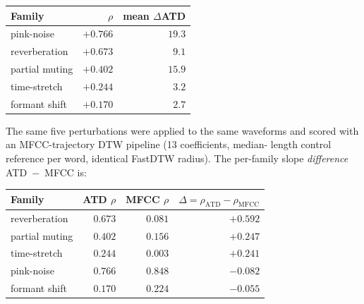 \begin{tabular}{lrr}
\toprule
Family & $\rho$ & mean $\Delta$ATD \\
\midrule
pink-noise       & $+0.766$ & $19.3$ \\
reverberation    & $+0.673$ & $9.1$  \\
partial muting   & $+0.402$ & $15.9$ \\
time-stretch     & $+0.244$ & $3.2$  \\
formant shift    & $+0.170$ & $2.7$  \\
\bottomrule
\end{tabular}

The same five perturbations were applied to the same waveforms and
scored with an MFCC-trajectory DTW pipeline (13 coefficients, median-
length control reference per word, identical FastDTW radius). The
per-family slope \emph{difference} ATD~$-$~MFCC is:

\begin{tabular}{lrrr}
\toprule
Family & ATD $\rho$ & MFCC $\rho$ & $\Delta = \rho_\text{ATD} - \rho_\text{MFCC}$ \\
\midrule
reverberation    & $0.673$ & $0.081$ & $\mathbf{+0.592}$ \\
partial muting   & $0.402$ & $0.156$ & $\mathbf{+0.247}$ \\
time-stretch     & $0.244$ & $0.003$ & $\mathbf{+0.241}$ \\
pink-noise       & $0.766$ & $0.848$ & $-0.082$ \\
formant shift    & $0.170$ & $0.224$ & $-0.055$ \\
\bottomrule
\end{tabular}

